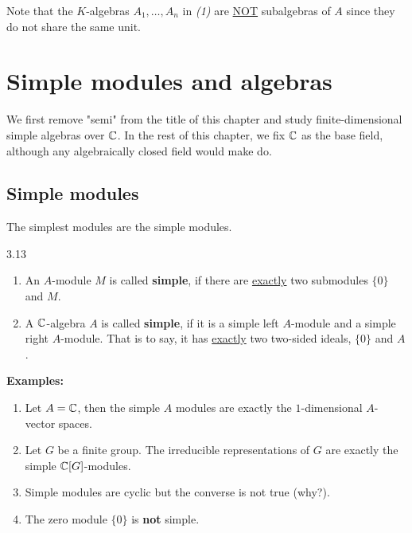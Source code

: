 \documentclass[twoside = false,	%
		headsepline,		%
		parskip = true,
		]{scrbook}						%
\begin{document}
    Note that the $K$-algebras $A_1,\dots, A_n$ in \textit{(1)} are \underline{NOT} subalgebras of $A$ since they do not share the same unit.

\section{Simple modules and algebras}
    We first remove "semi" from the title of this chapter and study finite-dimensional simple algebras over $\mathbb C$. In the rest of this chapter, we fix $\mathbb C$ as the base field, although any algebraically closed field would make do.
    
\subsection{Simple modules}
    The simplest modules are the simple modules.

    \begin{definition}{}{3.13}
        \begin{enumerate}
            \item An $A$-module $M$ is called \textbf{simple}, if there are \underline{exactly} two submodules $\{0\}$ and $M$.
            \item A $\mathbb C$-algebra $A$ is called \textbf{simple}, if it is a simple left $A$-module and a simple right $A$-module. That is to say, it has \underline{exactly} two two-sided ideals, $\{0\}$ and $A$.
        \end{enumerate}
    \end{definition}

    \textbf{Examples:}
    \begin{enumerate}
        \item Let $A = \mathbb C$, then the simple $A$ modules are exactly the $1$-dimensional $A$-vector spaces.
        \item Let $G$ be a finite group. The irreducible representations of $G$ are exactly the simple $\mathbb C[G]$-modules.
        \item Simple modules are cyclic but the converse is not true (why?).
        \item The zero module $\{0\}$ is \textbf{not} simple.
    \end{enumerate}
\end{document}
